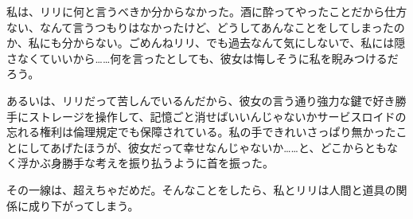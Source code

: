 私は、リリに何と言うべきか分からなかった。酒に酔ってやったことだから仕方ない、なんて言うつもりはなかったけど、どうしてあんなことをしてしまったのか、私にも分からない。ごめんねリリ、でも過去なんて気にしないで、私には隠さなくていいから……何を言ったとしても、彼女は悔しそうに私を睨みつけるだろう。

あるいは、リリだって苦しんでいるんだから、彼女の言う通り強力な鍵で好き勝手にストレージを操作して、記憶ごと消せばいいんじゃないか\？サービスロイドの忘れる権利は倫理規定でも保障されている。私の手できれいさっぱり無かったことにしてあげたほうが、彼女だって幸せなんじゃないか……と、どこからともなく浮かぶ身勝手な考えを振り払うように首を振った。

その一線は、超えちゃだめだ。そんなことをしたら、私とリリは人間と道具の関係に成り下がってしまう。
